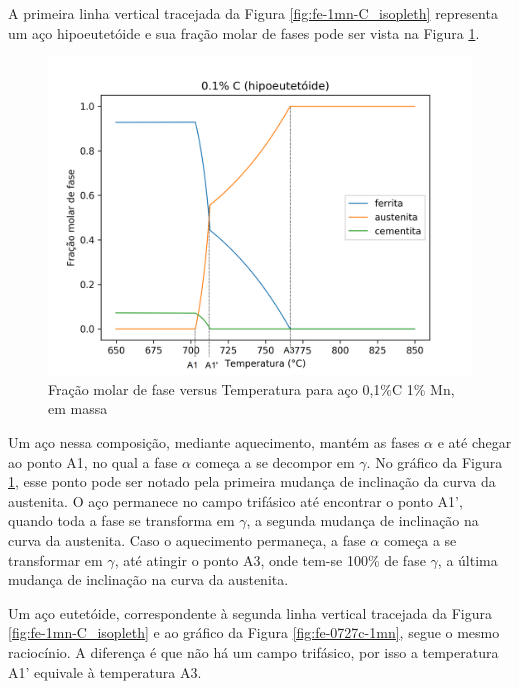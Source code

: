 \documentclass[brazil,tese,epusp]{usp}
\begin{document}
A primeira linha vertical tracejada da Figura \ref{fig:fe-1mn-C_isopleth} representa um aço hipoeutetóide e sua fração molar de fases pode ser vista na Figura \ref{fig:fe-01c-1mn}.

\begin{figure}[ht!]
  \includegraphics[width=1.1\textwidth]{img/Fe-Mn-01C_edited.png}
  \caption{Fração molar de fase versus Temperatura para aço 0,1\%C 1\% Mn, em massa}
  \label{fig:fe-01c-1mn}
\end{figure}

Um aço nessa composição, mediante aquecimento, mantém as fases $\alpha$ e  até chegar ao ponto A1, no qual a fase $\alpha$ começa a se decompor em $\gamma$. No gráfico da Figura \ref{fig:fe-01c-1mn}, esse ponto pode ser notado pela primeira mudança de inclinação da curva da austenita. O aço permanece no campo trifásico até encontrar o ponto A1', quando toda a fase  se transforma em $\gamma$, a segunda mudança de inclinação na curva da austenita. Caso o aquecimento permaneça, a fase $\alpha$ começa a se transformar em $\gamma$, até atingir o ponto A3, onde tem-se 100\% de fase $\gamma$, a última mudança de inclinação na curva da austenita.

Um aço eutetóide, correspondente à segunda linha vertical tracejada da Figura \ref{fig:fe-1mn-C_isopleth} e ao gráfico da Figura \ref{fig:fe-0727c-1mn}, segue o mesmo raciocínio. A diferença é que não há um campo trifásico, por isso a temperatura A1' equivale à temperatura A3.
\end{document}

